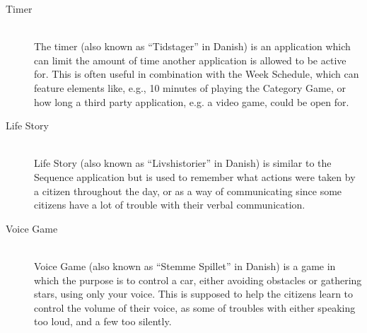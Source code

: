 \begin{description}
	\item[Timer] \hfill \\
	The timer (also known as ``Tidstager'' in Danish) is an application which can limit the amount of time another application is allowed to be active for.
	This is often useful in combination with the Week Schedule, which can feature elements like, e.g., 10 minutes of playing the Category Game, or how long a third party application, e.g. a video game, could be open for.
	\item[Life Story] \hfill \\
	Life Story (also known as ``Livshistorier'' in Danish) is similar to the Sequence application but is used to remember what actions were taken by a citizen throughout the day, or as a way of communicating since some citizens have a lot of trouble with their verbal communication. 
	\item[Voice Game] \hfill \\
	Voice Game (also known as ``Stemme Spillet'' in Danish) is a game in which the purpose is to control a car, either avoiding obstacles or gathering stars, using only your voice.
	This is supposed to help the citizens learn to control the volume of their voice, as some of troubles with either speaking too loud, and a few too silently.

\end{description}
